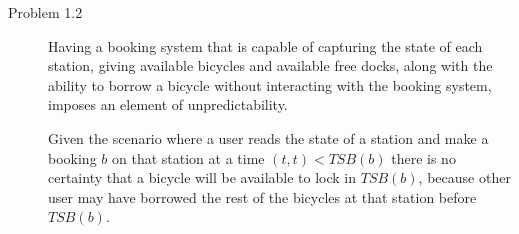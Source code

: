 \begin{description}\label{prob2}
	\item[Problem 1.2] Having a booking system that is capable of capturing the state of each station, giving available bicycles and available free docks, along with the ability to borrow a bicycle without interacting with the booking system, imposes an element of unpredictability.
	
	Given the scenario where a user reads the state of a station and make a booking $b$ on that station at a time $(t,t) < TSB(b)$ there is no certainty that a bicycle will be available to lock in $TSB(b)$, because other user may have borrowed the rest of the bicycles at that station before $TSB(b)$.
\end{description}

